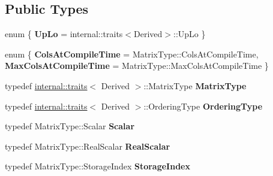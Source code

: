 \subsection*{Public Types}
\begin{DoxyCompactItemize}
\item 
\mbox{\label{class_eigen_1_1_simplicial_cholesky_base_a5daa76b4329e40d8601d88560676534a}} 
enum \{ {\bfseries Up\+Lo} = internal\+::traits$<$Derived$>$\+::Up\+Lo
 \}
\item 
\mbox{\label{class_eigen_1_1_simplicial_cholesky_base_a963d8a14f72a76047efcb97f235ac1f3}} 
enum \{ {\bfseries Cols\+At\+Compile\+Time} = Matrix\+Type\+::Cols\+At\+Compile\+Time, 
{\bfseries Max\+Cols\+At\+Compile\+Time} = Matrix\+Type\+::Max\+Cols\+At\+Compile\+Time
 \}
\item 
\mbox{\label{class_eigen_1_1_simplicial_cholesky_base_ac4d3851843aa1a04ce4849cc6ed27f71}} 
typedef \mbox{\hyperlink{struct_eigen_1_1internal_1_1traits}{internal\+::traits}}$<$ Derived $>$\+::Matrix\+Type {\bfseries Matrix\+Type}
\item 
\mbox{\label{class_eigen_1_1_simplicial_cholesky_base_afb046a5d3d43cd0c7d49e934db5c2091}} 
typedef \mbox{\hyperlink{struct_eigen_1_1internal_1_1traits}{internal\+::traits}}$<$ Derived $>$\+::Ordering\+Type {\bfseries Ordering\+Type}
\item 
\mbox{\label{class_eigen_1_1_simplicial_cholesky_base_a5bbf431a4e3fa0484560e206749cea02}} 
typedef Matrix\+Type\+::\+Scalar {\bfseries Scalar}
\item 
\mbox{\label{class_eigen_1_1_simplicial_cholesky_base_a14a24573a05a0653ea8e4c7a6616d544}} 
typedef Matrix\+Type\+::\+Real\+Scalar {\bfseries Real\+Scalar}
\item 
\mbox{\label{class_eigen_1_1_simplicial_cholesky_base_a7d5ace38d212f98e659bfdaf947372cc}} 
typedef Matrix\+Type\+::\+Storage\+Index {\bfseries Storage\+Index}
\item 

\end{DoxyCompactItemize}
